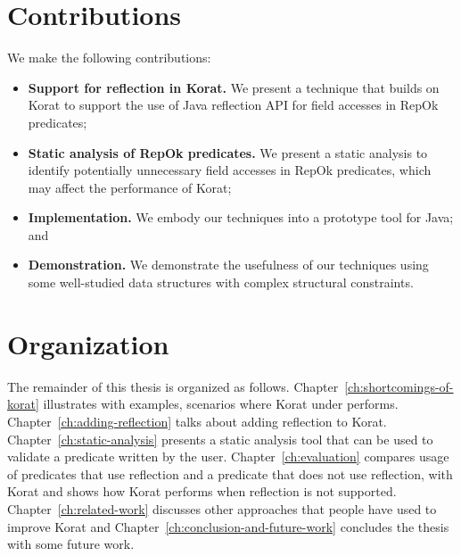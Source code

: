 \section{Contributions}
\label{sec:contributions}
\noindent We make the following contributions:

\begin{itemize}
\item {\bf Support for reflection in Korat.}  We present a technique
  that builds on Korat to support the use of Java reflection API for
  field accesses in RepOk predicates;
\item {\bf Static analysis of RepOk predicates.} We present a static
  analysis to identify potentially unnecessary field accesses in RepOk
  predicates, which may affect the performance of Korat;
\item {\bf Implementation.} We embody our techniques into a prototype
  tool for Java; and
\item {\bf Demonstration.} We demonstrate the usefulness of our
  techniques using some well-studied data structures with complex
  structural constraints.
\end{itemize}

\section{Organization}
\label{sec:organization-of-thesis}
The remainder of this thesis is organized as follows. Chapter~\ref{ch:shortcomings-of-korat} illustrates with examples, scenarios where Korat under performs. Chapter~\ref{ch:adding-reflection} talks about adding reflection to Korat. Chapter~\ref{ch:static-analysis} presents a static analysis tool that can be used to validate a predicate written by the user. Chapter~\ref{ch:evaluation} compares usage of predicates that use reflection and a predicate that does not use reflection, with Korat and shows how Korat performs when reflection is not supported. Chapter~\ref{ch:related-work} discusses other approaches that people have used to improve Korat and Chapter~\ref{ch:conclusion-and-future-work} concludes the thesis with some future work.

